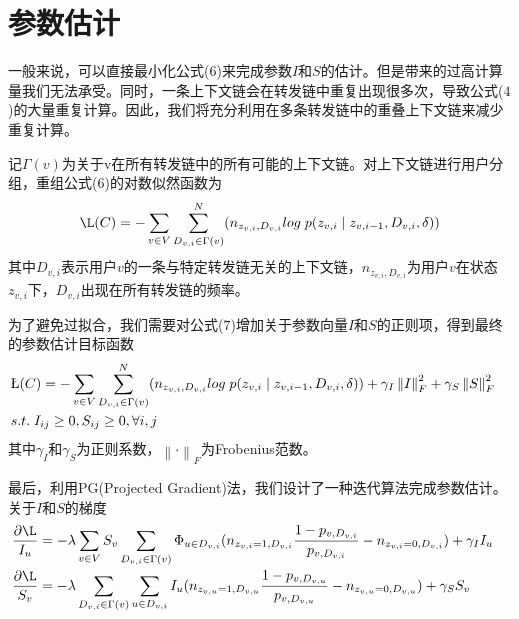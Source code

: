 \documentclass[UTF8]{ctexart}
\begin{document}
\section*{参数估计}
\par 一般来说，可以直接最小化公式($6$)来完成参数$I$和$S$的估计。但是带来的过高计算量我们无法承受。同时，一条上下文链会在转发链中重复出现很多次，导致公式($4$)的大量重复计算。因此，我们将充分利用在多条转发链中的重叠上下文链来减少重复计算。
\par 记$\Gamma (v)$为关于v在所有转发链中的所有可能的上下文链。对上下文链进行用户分组，重组公式($6$)的对数似然函数为
\begin{equation}
\L (C) = -\sum _{v \in V}\sum _{D_{v,i}\in \Gamma (v)}^{N}(n_{z_{v,i},D_{v,i}}log \; p(z_{v,i}\mid z_{v,i-1}, D_{v,i},\delta)) 
\end{equation}
其中$D_{v,i}$表示用户$v$的一条与特定转发链无关的上下文链，$n_{z_{v,i},D_{v,i}}$为用户$v$在状态$z_{v,i}$下，$D_{v,i}$出现在所有转发链的频率。
\par 为了避免过拟合，我们需要对公式($7$)增加关于参数向量$I$和$S$的正则项，得到最终的参数估计目标函数
\begin{equation}
\begin{matrix}
\begin{aligned} 
& \L (C) = -\sum _{v \in V}\sum _{D_{v,i}\in \Gamma (v)}^{N}(n_{z_{v,i},D_{v,i}}log \; p(z_{v,i}\mid z_{v,i-1}, D_{v,i},\delta)) + \gamma _{I}\left \| I \right \|_{F}^{2}+\gamma _{S}\left \| S \right \|_{F}^{2} &\\ 
& s.t.\; I_{ij}\geq 0,S_{ij}\geq 0,\forall i,j &
\end{aligned}
\end{matrix}
\end{equation}
其中$\gamma _{I}$和$\gamma _{S}$为正则系数，$\left \| \cdot  \right \|_{F}$为Frobenius范数。
\par 最后，利用PG(Projected Gradient)法，我们设计了一种迭代算法完成参数估计。关于$I$和$S$的梯度
\begin{equation}
\begin{matrix}
\begin{aligned}
& \frac{\partial \L}{I_{u}}=-\lambda \sum _{v \in V}S_{v}\sum _{D_{v,i}\in \Gamma (v)} \Phi _{u \in D_{v,i}}(n_{z_{v,i}=1,D_{v,i}}\frac{1-p_{v,D_{v,i}}}{p_{v,D_{v,i}}}-n_{z_{v,i}=0,D_{v,i}})+\gamma _{I}I_{u} & \\
& \frac{\partial \L}{S_{v}}=-\lambda \sum _{D_{v,i}\in \Gamma (v)}\sum _{u \in D_{v,i}} I _{u}(n_{z_{v,u}=1,D_{v,u}}\frac{1-p_{v,D_{v,u}}}{p_{v,D_{v,u}}}-n_{z_{v,u}=0,D_{v,u}})+\gamma _{S}S_{v} & \\
\end{aligned}
\end{matrix}
\end{equation} 
\end{document}
